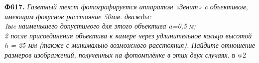 \documentclass{article}
\begin{document}
\begin{vwcol}[widths={0.35,0.65},sep=.5cm, justify=flush,rule=0pt,indent=1em] 
    \textbf{Ф617.} 
    \textit{Газетный текст фотографируется аппаратом «Зенит» c объективом, имеющим фокусное расстояние 50мм. дважды: \\1ыc наименьшего допустимого для этого объектива a=0,5 м;\\2 после присоединения объектива к камере через удлинительное кольцо высотой h = 25 мм (также с минимально возможного расстояния). Найдите отношение размеров изображений, полученных на фотомплёнке в этих двух случаях.}
    в
    \newpage
    w2
\end{vwcol} 
\end{document}
